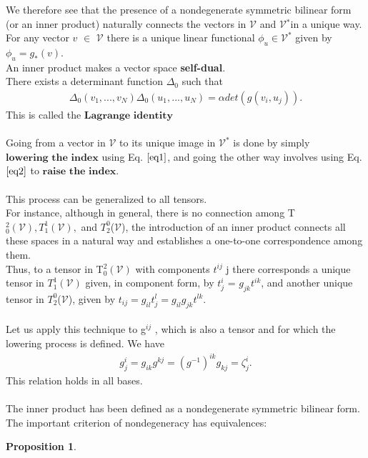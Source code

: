 \documentclass[12pt,a4paper]{article}
\newtheorem{prop}{Proposition}
\begin{document}
We therefore see that the presence of a nondegenerate symmetric bilinear
form (or an inner product) naturally connects the vectors in $\mathcal{V}$ and $\mathcal{V}$$^*$in a
unique way. \\For any vector $v$ $\in$ $\mathcal{V}$ there is a unique linear functional $\phi_u \in \mathcal{V}^*$
given by $\phi_u = g_*(v)$. \\An inner product
makes a vector space \textbf{self-dual}. \\There exists a determinant function $\Delta_0$ such that
\begin{align*}
\Delta_0 (v_1, ... , v_N) \Delta_0 ( u_1, ..., u_N) = \alpha det(g(v_i, u_j)).
\end{align*}
This is called the $\textbf{Lagrange identity}$\\
\\
Going from a vector in $\mathcal{V}$ to its unique image in $\mathcal{V}^*$ is done by simply $\textbf{lowering the index}$ using Eq. $\ref{eq1}$, and going the other way involves using Eq. $\ref{eq2}$ to $\textbf{raise the index}$.\\
\\
This process can be generalized to all tensors. \\For instance, although in general, there is no connection among T$^2_0(\mathcal{V}), T^1_1(\mathcal{V}),$ and $T_2^0$($\mathcal{V}$), the introduction of an inner product connects all
these spaces in a natural way and establishes a one-to-one correspondence
among them. \\Thus, to a tensor in T$^2_0(\mathcal{V})$ with components $t^{ij}$ j there corresponds a unique tensor in $T^1_1(\mathcal{V})$ given, in component form, by $t_j^i$ = $g_{jk}t^{ik}$, and another unique tensor in $T_2^0$($\mathcal{V}$), given by $t_{ij} = g_{il} t^l_j = g_{il} g_{jk} t^{lk}$.\\\\
Let us apply this technique to g$^{ij}$ , which is also a tensor and for which
the lowering process is defined. We have
\begin{align*}
g^i_j = g_{ik}g^{kj} = (g^{-1})^{ik} g_{kj} = \zeta_j^i.
\end{align*}
This relation holds in all bases.\\
\\
The inner product has been defined as a nondegenerate symmetric bilinear form. \\The important criterion of nondegeneracy has equivalences:
\begin{prop} \label{propdeg}

\end{prop}$$
\end{document}
